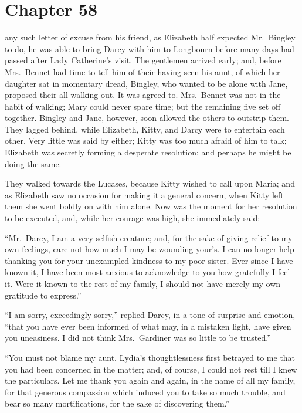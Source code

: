 \chapter{Chapter 58}


 any such letter of excuse from his friend,
as Elizabeth half expected Mr.\ Bingley to do, he was able to
bring Darcy with him to Longbourn before many days had passed
after Lady Catherine's visit.  The gentlemen arrived early;
and, before Mrs.\ Bennet had time to tell him of their having
seen his aunt, of which her daughter sat in momentary dread,
Bingley, who wanted to be alone with Jane, proposed their
all walking out.  It was agreed to.  Mrs.\ Bennet was not in
the habit of walking; Mary could never spare time; but the
remaining five set off together.  Bingley and Jane, however,
soon allowed the others to outstrip them.  They lagged behind,
while Elizabeth, Kitty, and Darcy were to entertain each other.
Very little was said by either; Kitty was too much afraid of
him to talk; Elizabeth was secretly forming a desperate
resolution; and perhaps he might be doing the same.

They walked towards the Lucases, because Kitty wished to call
upon Maria; and as Elizabeth saw no occasion for making it a
general concern, when Kitty left them she went boldly on with
him alone.  Now was the moment for her resolution to be
executed, and, while her courage was high, she immediately
said:

``Mr.\ Darcy, I am a very selfish creature; and, for the sake of
giving relief to my own feelings, care not how much I may be
wounding your's.  I can no longer help thanking you for your
unexampled kindness to my poor sister.  Ever since I have
known it, I have been most anxious to acknowledge to you how
gratefully I feel it.  Were it known to the rest of my family,
I should not have merely my own gratitude to express.''

``I am sorry, exceedingly sorry,'' replied Darcy, in a tone of
surprise and emotion, ``that you have ever been informed of what
may, in a mistaken light, have given you uneasiness.  I did not
think Mrs.\ Gardiner was so little to be trusted.''

``You must not blame my aunt.  Lydia's thoughtlessness first
betrayed to me that you had been concerned in the matter; and,
of course, I could not rest till I knew the particulars.  Let
me thank you again and again, in the name of all my family,
for that generous compassion which induced you to take so much
trouble, and bear so many mortifications, for the sake of
discovering them.''

